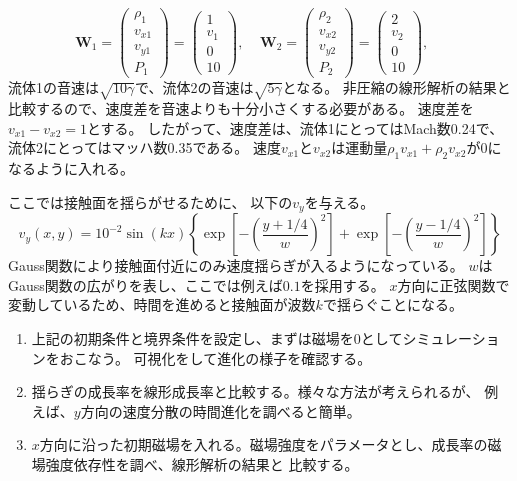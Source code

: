\begin{equation}
\bm{ W}_1 = \left(
\begin{array}{c}
\rho_1 \\
v_{x1} \\
v_{y1} \\
P_1 
\end{array}
\right)
= \left(
\begin{array}{c}
1 \\
v_1 \\
0 \\
1   0
\end{array}
\right),\;\;\;\;
\bm{ W}_2 = \left(
\begin{array}{c}
\rho_2 \\
v_{x2} \\
v_{y2} \\
P_2 
\end{array}
\right)
= \left(
\begin{array}{c}
2 \\
v_2 \\
0\\
10
\end{array}
\right),\;\;\;\;
\end{equation}
流体1の音速は$\sqrt{10\gamma}$で、流体2の音速は$\sqrt{5\gamma}$となる。
非圧縮の線形解析の結果と比較するので、速度差を音速よりも十分小さくする必要がある。
速度差を$v_{x1}-v_{x2} = 1$とする。
したがって、速度差は、流体1にとってはMach数0.24で、流体2にとってはマッハ数0.35である。
速度$v_{x1}$と$v_{x2}$は運動量$\rho_1v_{x1}+\rho_2 v_{x2}$が0になるように入れる。


ここでは接触面を揺らがせるために、
以下の$v_y$を与える。
\begin{equation}
    v_y(x,y) = 10^{-2}\sin(k x) \left\{
    \exp\left[
    - \left( \frac{y+1/4}{w} \right)^2
    \right]
    +\exp\left[
    - \left( \frac{y-1/4}{w} \right)^2
    \right]
    \right\}
\end{equation}
Gauss関数により接触面付近にのみ速度揺らぎが入るようになっている。
$w$はGauss関数の広がりを表し、ここでは例えば$0.1$を採用する。
$x$方向に正弦関数で変動しているため、時間を進めると接触面が波数$k$で揺らぐことになる。


\begin{enumerate}
\item 上記の初期条件と境界条件を設定し、まずは磁場を0としてシミュレーションをおこなう。
可視化をして進化の様子を確認する。

\item 揺らぎの成長率を線形成長率と比較する。様々な方法が考えられるが、
例えば、$y$方向の速度分散の時間進化を調べると簡単。

\item $x$方向に沿った初期磁場を入れる。磁場強度をパラメータとし、成長率の磁場強度依存性を調べ、線形解析の結果と
比較する。
    
\end{enumerate}



